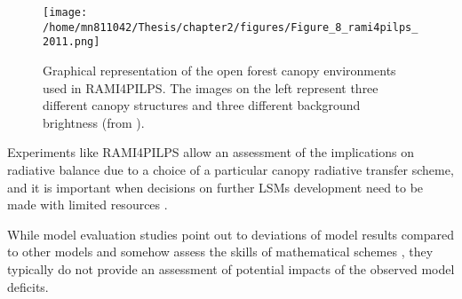 \begin{figure}[ht!]
\centering
\texttt{[image: /home/mn811042/Thesis/chapter2/figures/Figure\_8\_rami4pilps\_2011.png]}
\caption{Graphical representation of the open forest canopy environments used in RAMI4PILPS. The images on the left represent three different canopy structures and three different background brightness (from \citet{Widlowski2011}).}
\label{f:rami}
\end{figure}

Experiments like RAMI4PILPS allow an assessment of the implications on radiative balance due to a choice of a particular canopy radiative transfer scheme, and it is important when decisions on further LSMs development need to be made with limited resources \citep{loew2014}.

While model evaluation studies point out to deviations of model results compared to other models and somehow assess the skills of mathematical schemes \citep{Hagemann2013}, they typically do not provide an assessment of potential impacts of the observed model deficits.

